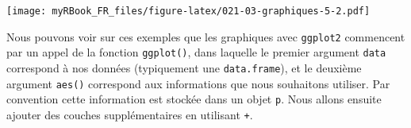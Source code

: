 \documentclass[twoside,symmetric]{book}
\newenvironment{Shaded}{}{}
\newcommand{\CommentTok}[1]{\textit{#1}}
\newcommand{\DataTypeTok}[1]{\underline{#1}}
\newcommand{\DecValTok}[1]{#1}
\newcommand{\FloatTok}[1]{#1}
\newcommand{\KeywordTok}[1]{\textbf{#1}}
\newcommand{\NormalTok}[1]{#1}
\newcommand{\OperatorTok}[1]{#1}
\newcommand{\StringTok}[1]{#1}
\begin{document}
\begin{Shaded}
\end{Shaded}

\texttt{[image: myRBook\_FR\_files/figure-latex/021-03-graphiques-5-2.pdf]}

Nous pouvons voir sur ces exemples que les graphiques avec \texttt{ggplot2} commencent par un appel de la fonction \texttt{ggplot()}, dans laquelle le premier argument \texttt{data} correspond à nos données (typiquement une \texttt{data.frame}), et le deuxième argument \texttt{aes()} correspond aux informations que nous souhaitons utiliser. Par convention cette information est stockée dans un objet \texttt{p}. Nous allons ensuite ajouter des couches supplémentaires en utilisant \texttt{+}.
\end{document}
